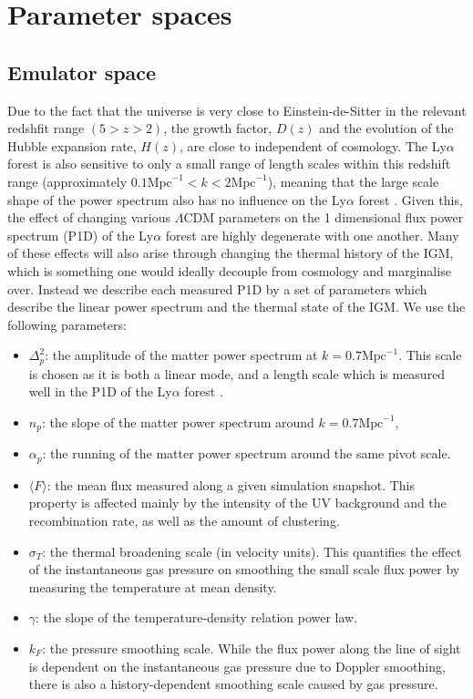 \documentclass[]{article}
\newcommand{\lyaf}{Ly$\alpha$ forest }                     %
\begin{document}
\section{Parameter spaces}
\subsection{Emulator space}
Due to the fact that the universe is very close to Einstein-de-Sitter in the relevant 
redshfit range $(5>z>2)$, the growth factor, $D(z)$ and the evolution of the Hubble 
expansion rate, $H(z)$, are close to independent of cosmology. The \lyaf is also 
sensitive to only a small range of length scales within this redshift range 
(approximately $0.1 \mathrm{Mpc}^{-1} < k < 2 \mathrm{Mpc}^{-1}$), meaning that the large 
scale shape of the power spectrum also has no influence on the \lyaf. Given this, the 
effect of changing various $\Lambda$CDM parameters on the 1 dimensional flux power 
spectrum (P1D) of the \lyaf are highly degenerate with one another. Many of these effects 
will also arise through changing the thermal history of the IGM, which is something one 
would ideally decouple from cosmology and marginalise over. Instead we describe each 
measured P1D by a set of parameters which describe the linear power spectrum and the 
thermal state of the IGM. We use the following parameters:

\begin{itemize}
    \item $\Delta^2_p$: the amplitude of the matter power spectrum at $k=0.7 \mathrm{Mpc}^
    {-1}$. This scale is chosen as it is both a linear mode, and a length scale which is 
    measured well in the P1D of the \lyaf.
    \item $n_p$: the slope of the matter power spectrum around $k=0.7 \mathrm{Mpc}^{-1}$,
    \item $\alpha_p$: the running of the matter power spectrum around the same pivot 
    scale.
    \item $\langle F\rangle$: the mean flux measured along a given simulation snapshot. 
    This property is affected mainly by the intensity of the UV background and the 
    recombination rate, as well as the amount of clustering.
    \item $\sigma_T$: the thermal broadening scale (in velocity units). This quantifies 
    the effect of the instantaneous gas pressure on smoothing the small scale flux power 
    by measuring the temperature at mean density.
    \item $\gamma$: the slope of the temperature-density relation power law.
    \item $k_F$: the pressure smoothing scale. While the flux power along the line of 
    sight is dependent on the instantaneous gas pressure due to Doppler smoothing, there 
    is also a history-dependent smoothing scale caused by gas pressure\cite{Hui1997}\cite{Gnedin1998}.
\end{itemize}
\end{document}
